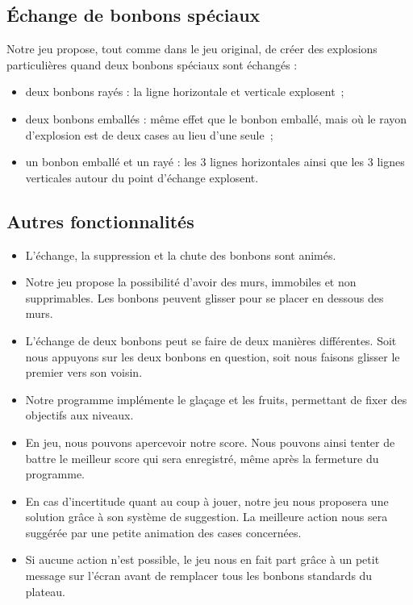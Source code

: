 \documentclass[11pt,a4paper]{article}
\begin{document}
\subsection{Échange de bonbons spéciaux}

Notre jeu propose, tout comme dans le jeu original, de créer des explosions
particulières quand deux bonbons spéciaux sont échangés :

\begin{itemize}
	\item deux bonbons rayés : la ligne horizontale et
        verticale explosent~;
	\item deux bonbons emballés : même effet que le bonbon
        emballé, mais où le rayon d'explosion est de deux
        cases au lieu d'une seule~;
	\item un bonbon emballé et un rayé : les 3 lignes horizontales ainsi que les 3 lignes verticales autour du point d'échange explosent.
\end{itemize}

\subsection{Autres fonctionnalités}
\begin{itemize}
	\item L'échange, la suppression et la chute des bonbons sont
        animés.
	\item Notre jeu propose la possibilité d'avoir des murs,
        immobiles et non supprimables.
        Les bonbons peuvent glisser pour se placer en dessous des murs.
	\item L'échange de deux bonbons peut se faire de deux
        manières différentes. Soit nous appuyons sur les
        deux bonbons en question, soit nous faisons glisser
        le premier vers son voisin.
	\item Notre programme implémente le glaçage et les
        fruits, permettant de fixer des objectifs aux niveaux.
	\item En jeu, nous pouvons apercevoir notre score. Nous
        pouvons ainsi tenter de battre le meilleur score qui
        sera enregistré, même après la fermeture du programme.
	\item En cas d'incertitude quant au coup à jouer, notre
        jeu nous proposera une solution grâce à son système
        de suggestion. La meilleure action nous sera suggérée par une petite animation des cases concernées.
	\item Si aucune action n'est possible, le jeu nous en
        fait part grâce à un petit message sur l'écran avant
        de remplacer tous les bonbons standards du plateau.
\end{itemize}
\end{document}

